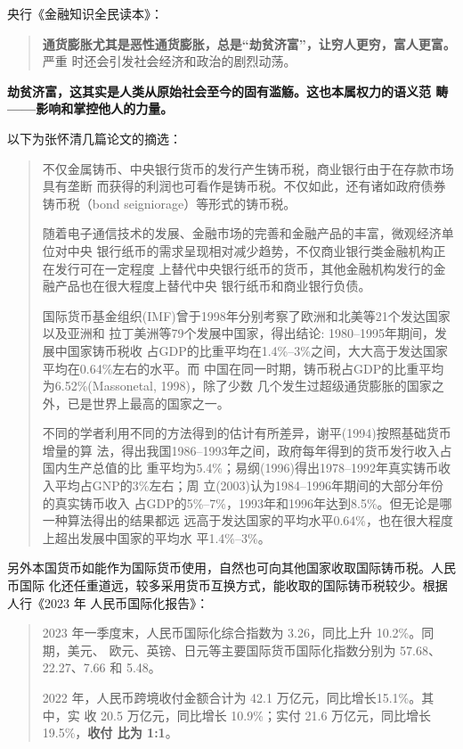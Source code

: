 央行《金融知识全民读本》：
\begin{quotation}
  \textbf{通货膨胀尤其是恶性通货膨胀，总是“劫贫济富”，让穷人更穷，富人更富。}严重
  时还会引发社会经济和政治的剧烈动荡。
\end{quotation}

\textbf{劫贫济富，这其实是人类从原始社会至今的固有滥觞。这也本属权力的语义范
  畴——影响和掌控他人的力量。}

以下为张怀清几篇论文的摘选：
\begin{quotation}
  不仅金属铸币、中央银行货币的发行产生铸币税，商业银行由于在存款市场具有垄断
  而获得的利润也可看作是铸币税。不仅如此，还有诸如政府债券铸币税（bond
  seigniorage）等形式的铸币税。

  随着电子通信技术的发展、金融市场的完善和金融产品的丰富，微观经济单位对中央
  银行纸币的需求呈现相对减少趋势，不仅商业银行类金融机构正在发行可在一定程度
  上替代中央银行纸币的货币，其他金融机构发行的金融产品也在很大程度上替代中央
  银行纸币和商业银行负债。

  国际货币基金组织(IMF)曾于1998年分别考察了欧洲和北美等21个发达国家以及亚洲和
  拉丁美洲等79个发展中国家，得出结论: 1980–1995年期间，发展中国家铸币税收
  占GDP的比重平均在1.4\%–3\%之间，大大高于发达国家平均在0.64\%左右的水平。而
  中国在同一时期，铸币税占GDP的比重平均为6.52\%(Massonetal, 1998)，除了少数
  几个发生过超级通货膨胀的国家之外，已是世界上最高的国家之一。

  不同的学者利用不同的方法得到的估计有所差异，谢平(1994)按照基础货币增量的算
  法，得出我国1986--1993年之间，政府每年得到的货币发行收入占国内生产总值的比
  重平均为5.4\%；易纲(1996)得出1978--1992年真实铸币收入平均占GNP的3\%左右；周
  立(2003)认为1984--1996年期间的大部分年份的真实铸币收入
  占GDP的5\%--7\%，1993年和1996年达到8.5\%。但无论是哪一种算法得出的结果都远
  远高于发达国家的平均水平0.64\%，也在很大程度上超出发展中国家的平均水
  平1.4\%--3\%。
\end{quotation}

另外本国货币如能作为国际货币使用，自然也可向其他国家收取国际铸币税。人民币国际
化还任重道远，较多采用货币互换方式，能收取的国际铸币税较少。根据人行《2023 年
人民币国际化报告》：
\begin{quotation}
  2023 年一季度末，人民币国际化综合指数为 3.26，同比上升 10.2\%。同期，美元、
  欧元、英镑、日元等主要国际货币国际化指数分别为 57.68、22.27、7.66 和 5.48。

  2022 年，人民币跨境收付金额合计为 42.1 万亿元，同比增长15.1\%。其中，实
  收 20.5 万亿元，同比增长 10.9\%；实付 21.6 万亿元，同比增长 19.5\%，\textbf{收付
    比为 1:1}。
\end{quotation}

